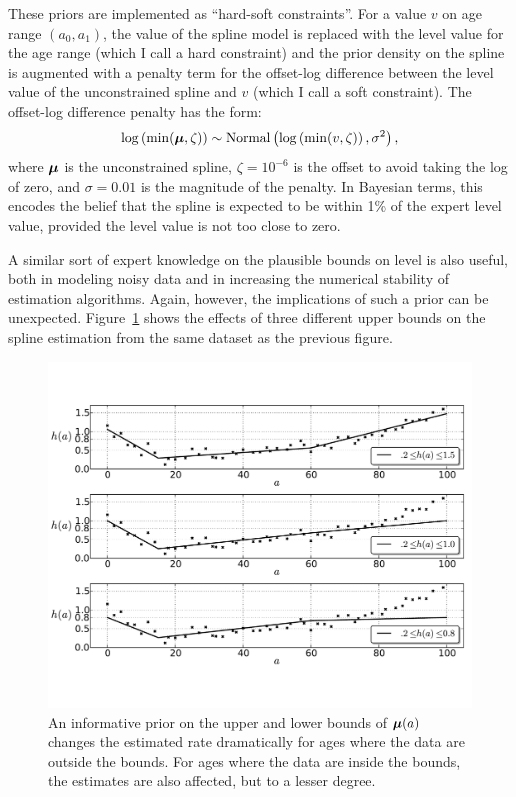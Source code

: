 These priors are implemented as ``hard-soft constraints''.  For a
value $v$ on age range $(a_0,a_1)$, the value of the spline model is
replaced with the level value for the age range (which I call a hard
constraint) and the prior density on the spline is augmented with a
penalty term for the offset-log difference between the level value of
the unconstrained spline and $v$ (which I call a soft constraint). The
offset-log difference penalty has the form:
\[
\log\left(\min(\boldsymbol{\mu}, \zeta)\right) \sim \operatorname{Normal}\left(\log\left(\min(v, \zeta)\right), \sigma^2\right),
\]
where $\boldsymbol{\mu}$ is the unconstrained spline, $\zeta = 10^{-6}$ is the
offset to avoid taking the log of zero, and $\sigma = 0.01$ is the
magnitude of the penalty.  In Bayesian terms, this encodes the belief
that the spline is expected to be within 1\% of the expert level
value, provided the level value is not too close to zero.

A similar sort of expert knowledge on the plausible bounds on
level is also useful, both in modeling noisy data and in increasing
the numerical stability of estimation algorithms. Again, however, the
implications of such a prior can be unexpected.
Figure~\ref{level-bounds-priors} shows the effects of three different
upper bounds on the spline estimation from the same dataset as the
previous figure.

\begin{figure}[h]
\begin{center}
\includegraphics[width=\textwidth]{level_bound-smoothing-splines.pdf}
\caption{An informative prior on the upper and
lower bounds of $\boldsymbol{\mu}(a)$ changes the estimated rate dramatically for
ages where the data are outside the bounds. For ages where the data are
inside the bounds, the estimates are also affected, but to a lesser
degree.}
\label{level-bounds-priors}
\end{center}
\end{figure}



